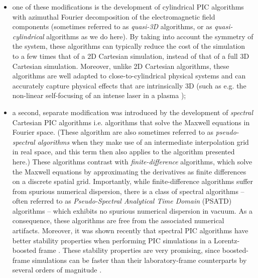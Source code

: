 \documentclass[1p,times]{elsarticle}
\begin{document}
\begin{itemize}
\item one of these modifications is the development of cylindrical 
PIC algorithms with azimuthal Fourier decomposition \cite{godfrey1985iprop,Lifschitz,Davidson} 
of the electromagnetic field components 
(sometimes referred to as \emph{quasi-3D} algorithms, or as
\emph{quasi-cylindrical} algorithms as we do here). By taking
into account the symmetry of the system, these algorithms can typically reduce
the cost of the simulation to a few times that of a 2D Cartesian simulation,
instead of that of a full 3D Cartesian simulation. Moreover, unlike 2D
Cartesian algorithms, these algorithms are well adapted to close-to-cylindrical
physical systems and can accurately capture physical effects that are intrinsically
3D (such as e.g. the non-linear self-focusing of an intense laser in a
plasma \cite{EsareyRMP2009});

\item a second, separate modification was introduced by the development
  of \emph{spectral} Cartesian PIC algorithms
  \cite{LinPhysFluids1974,Haber,BunemanJCP1980,DawsonRMP1983,Liu} i.e. algorithms that solve the
  Maxwell equations in Fourier space. (These algorithm are also sometimes referred to as
  \emph{pseudo-spectral algorithms} when they make use of an
  intermediate interpolation grid in real space, and this term then
  also applies to the algorithm presented here.) These algorithms contrast with
  \emph{finite-difference} algorithms, which solve the Maxwell equations
  by approximating the derivatives as finite differences on a discrete spatial grid.
Importantly, while finite-difference algorithms suffer from
spurious numerical dispersion, there is a class of spectral algorithms
-- often referred to as \emph{Pseudo-Spectral Analytical Time Domain}
(PSATD) algorithms 
\cite{Haber,BunemanJCP1980} -- which exhibits no spurious numerical
dispersion in vacuum. As a
consequence, these algorithms are free from the associated numerical
artifacts. Moreover, it was shown recently
\cite{GodfreyJCP2014,GodfreyIEEE2014,YuJCP2014,YuCPC2015} 
that spectral PIC algorithms have better stability properties when 
performing PIC simulations in
a Lorentz-boosted frame \cite{VayPRL2007,MartinsNatPhys2010,VayJCP2011}. 
These stability properties are very
promising, since boosted-frame simulations can be faster than 
their laboratory-frame counterparts by several orders of magnitude \cite{VayPRL2007}.
\end{itemize}
\end{document}
